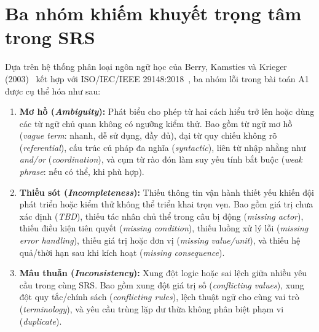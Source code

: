 \documentclass[12pt,a4paper]{report}
\begin{document}
\section{Ba nhóm khiếm khuyết trọng tâm trong SRS}
Dựa trên hệ thống phân loại ngôn ngữ học của Berry, Kamsties và Krieger (2003)~\cite{berry2003} kết hợp với ISO/IEC/IEEE 29148:2018~\cite{iso29148}, ba nhóm lỗi trong bài toán A1 được cụ thể hóa như sau:

\begin{definitionbox}
\begin{enumerate}
  \item \textbf{Mơ hồ (\textit{Ambiguity}):} Phát biểu cho phép từ hai cách hiểu trở lên hoặc dùng các từ ngữ chủ quan không có ngưỡng kiểm thử. Bao gồm từ ngữ mơ hồ (\textit{vague term}: nhanh, dễ sử dụng, đầy đủ), đại từ quy chiếu không rõ (\textit{referential}), cấu trúc cú pháp đa nghĩa (\textit{syntactic}), liên từ nhập nhằng như \textit{and/or} (\textit{coordination}), và cụm từ rào đón làm suy yếu tính bắt buộc (\textit{weak phrase}: nếu có thể, khi phù hợp).
  \item \textbf{Thiếu sót (\textit{Incompleteness}):} Thiếu thông tin vận hành thiết yếu khiến đội phát triển hoặc kiểm thử không thể triển khai trọn vẹn. Bao gồm giá trị chưa xác định (\textit{TBD}), thiếu tác nhân chủ thể trong câu bị động (\textit{missing actor}), thiếu điều kiện tiên quyết (\textit{missing condition}), thiếu luồng xử lý lỗi (\textit{missing error handling}), thiếu giá trị hoặc đơn vị (\textit{missing value/unit}), và thiếu hệ quả/thời hạn sau khi kích hoạt (\textit{missing consequence}).
  \item \textbf{Mâu thuẫn (\textit{Inconsistency}):} Xung đột logic hoặc sai lệch giữa nhiều yêu cầu trong cùng SRS. Bao gồm xung đột giá trị số (\textit{conflicting values}), xung đột quy tắc/chính sách (\textit{conflicting rules}), lệch thuật ngữ cho cùng vai trò (\textit{terminology}), và yêu cầu trùng lặp dư thừa không phân biệt phạm vi (\textit{duplicate}).
\end{enumerate}
\end{definitionbox}
\end{document}
